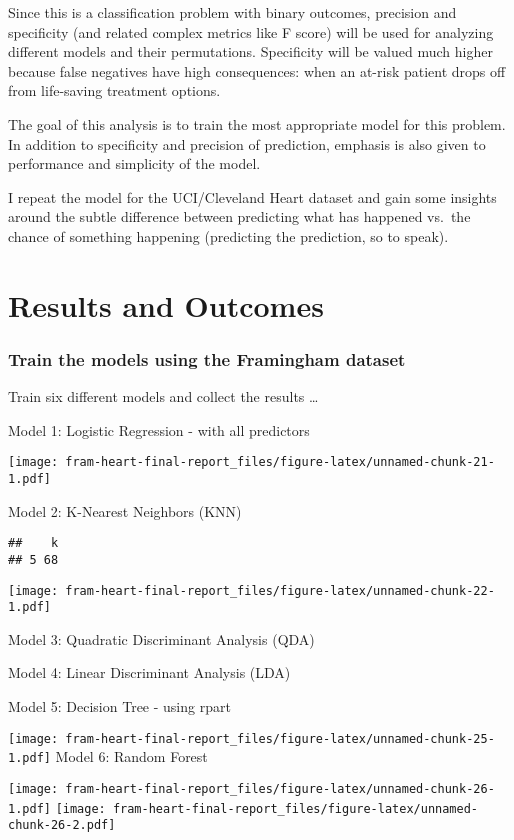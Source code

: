 \documentclass[]{article}
\begin{document}
Since this is a classification problem with binary outcomes, precision
and specificity (and related complex metrics like F score) will be used
for analyzing different models and their permutations. Specificity will
be valued much higher because false negatives have high consequences:
when an at-risk patient drops off from life-saving treatment options.

The goal of this analysis is to train the most appropriate model for
this problem. In addition to specificity and precision of prediction,
emphasis is also given to performance and simplicity of the model.

I repeat the model for the UCI/Cleveland Heart dataset and gain some
insights around the subtle difference between predicting what has
happened vs.~the chance of something happening (predicting the
prediction, so to speak).

\section{Results and Outcomes}\label{results-and-outcomes}

\subsubsection{Train the models using the Framingham
dataset}\label{train-the-models-using-the-framingham-dataset}

Train six different models and collect the results \ldots{}

Model 1: Logistic Regression - with all predictors

\texttt{[image: fram-heart-final-report\_files/figure-latex/unnamed-chunk-21-1.pdf]}

Model 2: K-Nearest Neighbors (KNN)

\begin{verbatim}
##    k
## 5 68
\end{verbatim}

\texttt{[image: fram-heart-final-report\_files/figure-latex/unnamed-chunk-22-1.pdf]}

Model 3: Quadratic Discriminant Analysis (QDA)

Model 4: Linear Discriminant Analysis (LDA)

Model 5: Decision Tree - using rpart

\texttt{[image: fram-heart-final-report\_files/figure-latex/unnamed-chunk-25-1.pdf]}
Model 6: Random Forest

\texttt{[image: fram-heart-final-report\_files/figure-latex/unnamed-chunk-26-1.pdf]}
\texttt{[image: fram-heart-final-report\_files/figure-latex/unnamed-chunk-26-2.pdf]}
\end{document}
